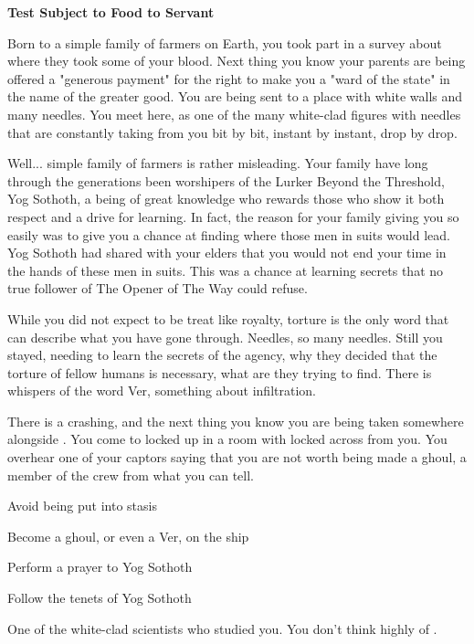\documentclass[char]{guildcamp4}
\begin{document}
\name{\cPlead{}}

\begin{center}{\bf Test Subject to Food to Servant}\end{center}

Born to a simple family of farmers on Earth, you took part in a survey about where they took some of your blood. Next thing you know your parents are being offered a "generous payment" for the right to make you a "ward of the state" in the name of the greater good. You are being sent to a place with white walls and many needles. You meet \cSpite{}  here, as one of the many white-clad figures with needles that are constantly taking from you bit by bit, instant by instant, drop by drop. 

Well... simple family of farmers is rather misleading. Your family have long through the generations been worshipers of the Lurker Beyond the Threshold, Yog Sothoth, a being of great knowledge who rewards those who show it both respect and a drive for learning. In fact, the reason for your family giving you so easily was to give you a chance at finding where those men in suits would lead. Yog Sothoth had shared with your elders that you would not end your time in the hands of these men in suits. This was a chance at learning secrets that no true follower of The Opener of The Way could refuse. 

While you did not expect to be treat like royalty, torture is the only word that can describe what you have gone through. Needles, so many needles. Still you stayed, needing to learn the secrets of the agency, why they decided that the torture of fellow humans is necessary, what are they trying to find. There is whispers of the word Ver, something about infiltration.

There is a crashing, and the next thing you know you are being taken somewhere alongside \cSpite{}. You come to locked up in a room with \cSpite{} locked across from you. You overhear one of your captors saying that you are not worth being made a ghoul, a member of the crew from what you can tell.

\begin{itemz}[Goals]
	\item Avoid being put into stasis
	\item Become a ghoul, or even a Ver, on the ship
	\item Perform a prayer to Yog Sothoth
	\item Follow the tenets of Yog Sothoth
\end{itemz}

\begin{contacts}
	\contact{\cSpite{}} One of the white-clad scientists who studied you. You don't think highly of \cSpite{\them}.
\end{contacts}
\end{document}

